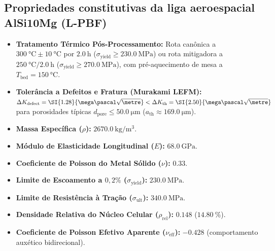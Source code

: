 \begin{apendicesenv}
\section*{Propriedades constitutivas da liga aeroespacial AlSi10Mg (L-PBF)}
\begin{itemize}
  \item \textbf{Tratamento Térmico Pós-Processamento:} Rota canônica a $\SI{300}{\celsius} \pm \SI{10}{\celsius}$ por $\SI{2.0}{\hour}$ ($\sigma_{\text{yield}} \ge \SI{230.0}{\mega\pascal}$) ou rota mitigadora a $\SI{250}{\celsius} / \SI{2.0}{\hour}$ ($\sigma_{\text{yield}} \ge \SI{270.0}{\mega\pascal}$), com pré-aquecimento de mesa a $T_{\text{bed}} = \SI{150}{\celsius}$.
  \item \textbf{Tolerância a Defeitos e Fratura (Murakami LEFM):} $\Delta K_{\text{defect}} = \SI{1.28}{\mega\pascal\sqrt{\metre}} < \Delta K_{\text{th}} = \SI{2.50}{\mega\pascal\sqrt{\metre}}$ para porosidades típicas $d_{\text{pore}} \le \SI{50.0}{\micro\metre}$ ($a_{\text{th}} \approx \SI{169.0}{\micro\metre}$).
  \item \textbf{Massa Específica ($\rho$):} $\SI{2670.0}{\kilo\gram\per\cubic\metre}$.
  \item \textbf{Módulo de Elasticidade Longitudinal ($E$):} $\SI{68.0}{\giga\pascal}$.
  \item \textbf{Coeficiente de Poisson do Metal Sólido ($\nu$):} $\num{0.33}$.
  \item \textbf{Limite de Escoamento a $0{,}2\%$ ($\sigma_{\text{yield}}$):} $\SI{230.0}{\mega\pascal}$.
  \item \textbf{Limite de Resistência à Tração ($\sigma_{\text{ult}}$):} $\SI{340.0}{\mega\pascal}$.
  \item \textbf{Densidade Relativa do Núcleo Celular ($\rho_{\text{rel}}$):} $\num{0.148}$ ($\SI{14.80}{\percent}$).
  \item \textbf{Coeficiente de Poisson Efetivo Aparente ($\nu_{\text{eff}}$):} $\num{-0.428}$ (comportamento auxético bidirecional).
\end{itemize}


\end{apendicesenv}

